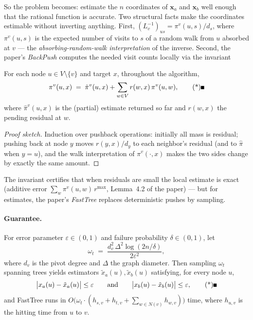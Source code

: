 So the problem becomes: estimate the $n$ coordinates of $\mathbf{x}_a$ and $\mathbf{x}_b$ well
enough that the rational function is accurate. Two structural facts make the coordinates
estimable without inverting anything. First, $(L_v^{-1})_{us} = \pi^v(u,s)/d_s$, where
$\pi^v(u,s)$ is the expected number of visits to $s$ of a random walk from $u$ absorbed at
$v$ --- the \emph{absorbing-random-walk interpretation} of the inverse. Second, the paper's
\emph{BackPush} computes the needed visit counts locally via the invariant

\begin{lemma}\label{lem:est-bd-invariant}
For each node $u \in V \setminus \{v\}$ and target $x$, throughout the algorithm,
\[
\pi^v(u,x) \;=\; \hat\pi^v(u,x) + \sum_{w \in V} r(w,x)\,\pi^v(u,w), \eopm
\]
where $\hat\pi^v(u,x)$ is the (partial) estimate returned so far and $r(w,x)$ the pending
residual at $w$.
\end{lemma}

\begin{proof}[Proof sketch]
Induction over pushback operations: initially all mass is residual; pushing back at node $y$ moves
$r(y,x)/d_y$ to each neighbor's residual (and to $\hat\pi$ when $y = u$), and the walk
interpretation of $\pi^v(\cdot,x)$ makes the two sides change by exactly the same amount.
\end{proof}

The invariant certifies that when residuals are small the local estimate is exact
(additive error $\sum_w \pi^v(u,w)\, r^{\max}$, Lemma~4.2 of the paper) --- but for estimates, the
paper's \emph{FastTree} replaces deterministic pushes by sampling.

\paragraph{Guarantee.}

\begin{theorem}\label{thm:est-bd-fasttree}
For error parameter $\varepsilon \in (0,1)$ and failure probability $\delta \in (0,1)$, let
\[
\omega_t \;=\; \frac{d_v^2\,\Delta^2 \log(2n/\delta)}{2\varepsilon^2},
\]
where $d_v$ is the pivot degree and $\Delta$ the graph diameter. Then sampling $\omega_t$ spanning
trees yields estimators $\tilde x_a(u), \tilde x_b(u)$ satisfying, for every node $u$,
\[
\bigl|x_a(u) - \tilde x_a(u)\bigr| \le \varepsilon
\qquad\text{and}\qquad
\bigl|x_b(u) - \tilde x_b(u)\bigr| \le \varepsilon, \eopm
\]
and FastTree runs in $O\bigl(\omega_t \cdot (h_{s,v} + h_{t,v} + \sum_{w\in N(v)} h_{w,v})\bigr)$
time, where $h_{u,v}$ is the hitting time from $u$ to $v$.
\end{theorem}

